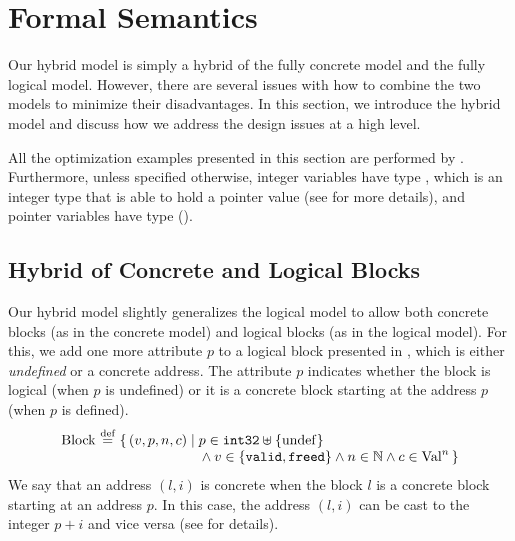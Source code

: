 \section{Formal Semantics}
\label{sec:intptrcast:formal-semantics}

Our hybrid model is simply a hybrid of the fully concrete
model and the fully logical model. However, there are several issues
with how to combine the two models to minimize their disadvantages.
In this section, we introduce the hybrid model and discuss how
we address the design issues at a high level.  %

All the optimization examples presented in this section are performed by .
Furthermore, unless specified otherwise, integer variables have type , which is an
integer type that is able to hold a pointer value (see  for more details), and
pointer variables have type ().


\subsection{Hybrid of Concrete and Logical Blocks}
\label{sec:intptrcast:formal-semantics:representation}

Our hybrid model slightly generalizes the logical model to allow
both concrete blocks (as in the concrete model) and logical blocks (as
in the logical model). For this, we add one more attribute $p$ to a
logical block presented in ,
which is either \emph{undefined} or a concrete address.
The attribute $p$ indicates whether the block is logical (when $p$ is
undefined) or it is a concrete block starting at the address $p$ (when
$p$ is defined).
\[
\begin{array}{@{}l@{~}c@{~}l@{}}
\mathrm{Block} &\defeq&
\setof{(v, p, n, c) \suchthat
  p \in \mathtt{int32}\uplus\setofz{\mathrm{undef}} \\
&&\qquad\qquad\quad~~
  {}\land v \in \setofz{\rtlvalid,\rtlfreed} \land n \in \Nat \land c \in \rtlVal^n }
\end{array}
\]
We say that an address $(l,i)$ is concrete when the block $l$ is a
concrete block starting at an address $p$. 
In this case, the address $(l,i)$ can be cast to the integer $p+i$
and vice versa (see  for details).

